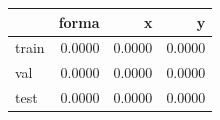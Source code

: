 \begin{tabular}{lrrr}
\toprule
 & forma & x & y \\
\midrule
train & 0.0000 & 0.0000 & 0.0000 \\
val & 0.0000 & 0.0000 & 0.0000 \\
test & 0.0000 & 0.0000 & 0.0000 \\
\bottomrule
\end{tabular}
